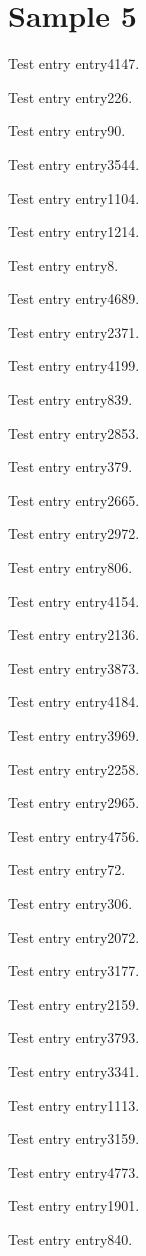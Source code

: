 \chapter{Sample 5}
Test entry \gls{entry4147}.

Test entry \gls{entry226}.

Test entry \gls{entry90}.

Test entry \gls{entry3544}.

Test entry \gls{entry1104}.

Test entry \gls{entry1214}.

Test entry \gls{entry8}.

Test entry \gls{entry4689}.

Test entry \gls{entry2371}.

Test entry \gls{entry4199}.

Test entry \gls{entry839}.

Test entry \gls{entry2853}.

Test entry \gls{entry379}.

Test entry \gls{entry2665}.

Test entry \gls{entry2972}.

Test entry \gls{entry806}.

Test entry \gls{entry4154}.

Test entry \gls{entry2136}.

Test entry \gls{entry3873}.

Test entry \gls{entry4184}.

Test entry \gls{entry3969}.

Test entry \gls{entry2258}.

Test entry \gls{entry2965}.

Test entry \gls{entry4756}.

Test entry \gls{entry72}.

Test entry \gls{entry306}.

Test entry \gls{entry2072}.

Test entry \gls{entry3177}.

Test entry \gls{entry2159}.

Test entry \gls{entry3793}.

Test entry \gls{entry3341}.

Test entry \gls{entry1113}.

Test entry \gls{entry3159}.

Test entry \gls{entry4773}.

Test entry \gls{entry1901}.

Test entry \gls{entry840}.

